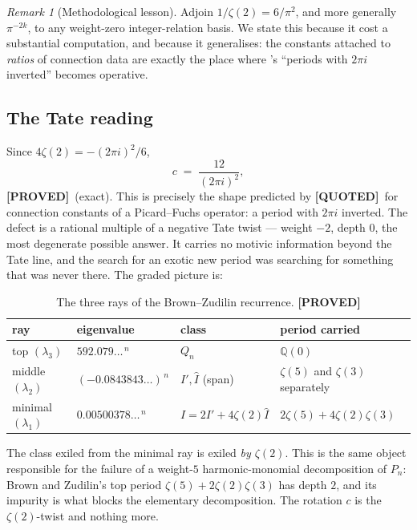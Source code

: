 \documentclass[11pt,reqno]{amsart}
\theoremstyle{plain}
\theoremstyle{definition}
\theoremstyle{remark}
\newtheorem{remark}[theorem]{Remark}
\newcommand{\PROVED}{{\normalfont\sffamily\bfseries[PROVED]}}
\newcommand{\QUOTEDMARK}{{\normalfont\sffamily\bfseries[QUOTED]}}
\newcommand{\QUOTED}[1]{\QUOTEDMARK\,#1}
\newcommand{\QQ}{\mathbb{Q}}
\newcommand{\Ihat}{\widehat{I}}
\begin{document}
\begin{remark}[Methodological lesson]\label{rem:lesson}
Adjoin $1/\zeta(2)=6/\pi^2$, and more generally $\pi^{-2k}$, to any weight-zero integer-relation
basis. We state this because it cost a substantial computation, and because it generalises: the
constants attached to \emph{ratios} of connection data are exactly the place where
\cite[Cor.~31]{BV}'s ``periods with $2\pi i$ inverted'' becomes operative.
\end{remark}

\subsection{The Tate reading}
Since $4\zeta(2)=-(2\pi i)^2/6$,
\begin{equation}\label{eq:tate}
  c\;=\;\frac{12}{(2\pi i)^2},
\end{equation}
\PROVED\ (exact). This is precisely the shape predicted by \QUOTED{\cite[Cor.~31]{BV}} for
connection constants of a Picard--Fuchs operator: a period with $2\pi i$ inverted. The defect is
a rational multiple of a negative Tate twist --- weight $-2$, depth $0$, the most degenerate
possible answer. It carries no motivic information beyond the Tate line, and the search for an
exotic new period was searching for something that was never there. The graded picture is:

\begin{table}[h]
\centering
\caption{The three rays of the Brown--Zudilin recurrence. \PROVED}
\label{tab:rays}
\begin{tabular}{llll}
\toprule
ray & eigenvalue & class & period carried \\
\midrule
top $(\lambda_3)$     & $592.079\ldots^{\,n}$   & $Q_n$ & $\QQ(0)$ \\
middle $(\lambda_2)$  & $(-0.0843843\ldots)^{\,n}$ & $I',\Ihat$ (span) & $\zeta(5)$ and $\zeta(3)$ separately \\
minimal $(\lambda_1)$ & $0.00500378\ldots^{\,n}$& $I=2I'+4\zeta(2)\Ihat$ & $2\zeta(5)+4\zeta(2)\zeta(3)$ \\
\bottomrule
\end{tabular}
\end{table}

The class exiled from the minimal ray is exiled \emph{by $\zeta(2)$}. This is the same object
responsible for the failure of a weight-$5$ harmonic-monomial decomposition of $P_n$: Brown and
Zudilin's top period $\zeta(5)+2\zeta(2)\zeta(3)$ has depth $2$, and its impurity is what blocks
the elementary decomposition. The rotation $c$ is the $\zeta(2)$-twist and nothing more.
\end{document}
